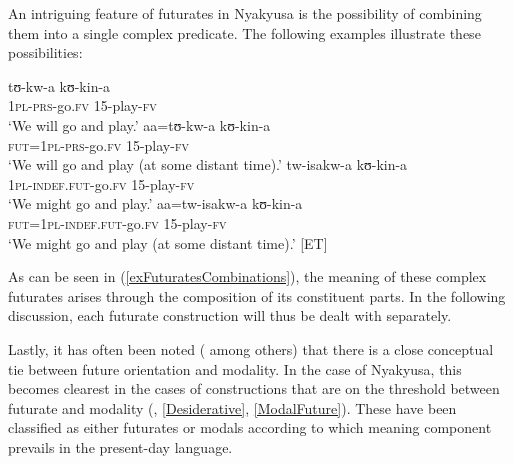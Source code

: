 An intriguing feature of futurates in Nyakyusa is the possibility of combining them into a single complex predicate. The following examples illustrate these possibilities:
\begin{exe}
\ex \label{exFuturatesCombinations}
\begin{xlist}
\ex \gll tʊ-kw-a kʊ-kin-a\\
\textsc{1pl}-\textsc{prs}-go.\textsc{fv} 15-play-\textsc{fv}\\
\glt \lq We will go and play.'
\ex \gll aa=tʊ-kw-a kʊ-kin-a\\
\textsc{fut}=\textsc{1pl}-\textsc{prs}-go.\textsc{fv} 15-play-\textsc{fv}\\
\glt `We will go and play (at some distant time).'
\ex \gll tw-isakw-a kʊ-kin-a\\
\textsc{1pl}-\textsc{indef.fut}-go.\textsc{fv} 15-play-\textsc{fv}\\
\glt `We might go and play.'
\ex  \gll aa=tw-isakw-a kʊ-kin-a\\
\textsc{fut}=\textsc{1pl}-\textsc{indef.fut}-go.\textsc{fv} 15-play-\textsc{fv}\\
\glt `We might go and play (at some distant time).' [ET]
\end{xlist}
\end{exe}
As can be seen in (\ref{exFuturatesCombinations}), the meaning of these complex futurates arises through the composition of its constituent parts. In the following discussion, each futurate construction will thus be dealt with separately.

Lastly, it has often been noted (\citealt[103]{DahlOe1985} among others) that there is a close conceptual tie between future orientation and modality. In the case of Nyakyusa, this becomes clearest in the cases of constructions that are on the threshold between futurate and modality (, \ref{Desiderative}, \ref{ModalFuture}). These have been classified as either futurates or modals according to which meaning component prevails in the present-day language.
